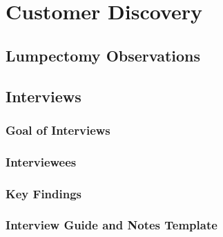 \newpage
\section{Customer Discovery\label{methedology:customerDiscovery}}

\subsection{Lumpectomy Observations\label{sec:methedology:customerDiscovery:lumpectomyObservations}}

\subsection{Interviews\label{sec:methedology:customerDiscovery:interviews}}

\subsubsection{Goal of Interviews\label{sec:methedology:customerDiscovery:interviews:goal}}

\subsubsection{Interviewees\label{sec:methedology:customerDiscovery:interviews:interviewees}}

\subsubsection{Key Findings\label{sec:methedology:customerDiscovery:interviews:keyFindings}}

\subsubsection{Interview Guide and Notes Template\label{sec:methedology:customerDiscovery:interviews:guideAndNotes}}
